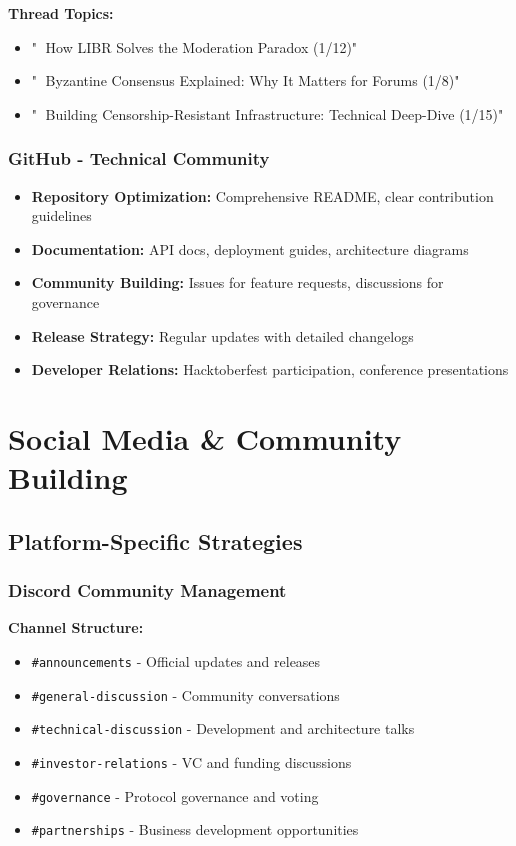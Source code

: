 \documentclass[12pt,a4paper]{article}
\begin{document}
\textbf{Thread Topics:}
\begin{itemize}
    \item "🧵 How LIBR Solves the Moderation Paradox (1/12)"
    \item "🧵 Byzantine Consensus Explained: Why It Matters for Forums (1/8)"  
    \item "🧵 Building Censorship-Resistant Infrastructure: Technical Deep-Dive (1/15)"
\end{itemize}

\subsubsection{GitHub - Technical Community}
\begin{itemize}
    \item \textbf{Repository Optimization:} Comprehensive README, clear contribution guidelines
    \item \textbf{Documentation:} API docs, deployment guides, architecture diagrams
    \item \textbf{Community Building:} Issues for feature requests, discussions for governance
    \item \textbf{Release Strategy:} Regular updates with detailed changelogs
    \item \textbf{Developer Relations:} Hacktoberfest participation, conference presentations
\end{itemize}

\section{Social Media \& Community Building}

\subsection{Platform-Specific Strategies}

\subsubsection{Discord Community Management}
\textbf{Channel Structure:}
\begin{itemize}
    \item \texttt{\#announcements} - Official updates and releases
    \item \texttt{\#general-discussion} - Community conversations
    \item \texttt{\#technical-discussion} - Development and architecture talks
    \item \texttt{\#investor-relations} - VC and funding discussions
    \item \texttt{\#governance} - Protocol governance and voting
    \item \texttt{\#partnerships} - Business development opportunities
\end{itemize}
\end{document}
